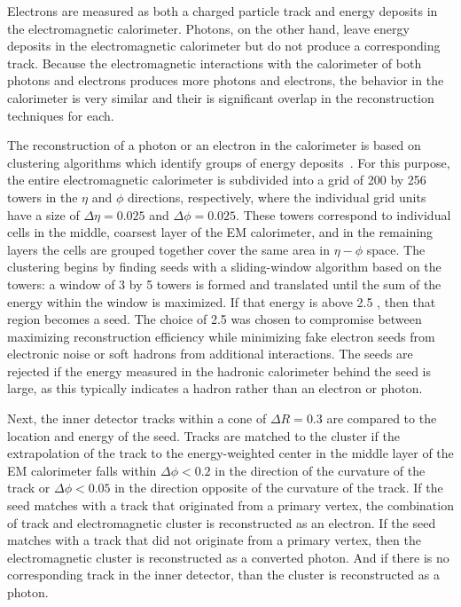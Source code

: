 Electrons are measured as both a charged particle track and energy deposits in the electromagnetic calorimeter.
Photons, on the other hand, leave energy deposits in the electromagnetic calorimeter but do not produce a corresponding track.
Because the electromagnetic interactions with the calorimeter of both photons and electrons produces more photons and electrons, the behavior in the calorimeter is very similar and their is significant overlap in the reconstruction techniques for each.

The reconstruction of a photon or an electron in the calorimeter is based on clustering algorithms which identify groups of energy deposits~\cite{PERF-2013-03, ATLAS-CONF-2014-032, ATLAS-CONF-2012-123}.
For this purpose, the entire electromagnetic calorimeter is subdivided into a grid of 200 by 256 towers in the $\eta$ and $\phi$ directions, respectively, where the individual grid units have a size of $\Delta\eta = 0.025$ and $\Delta\phi = 0.025$.
These towers correspond to individual cells in the middle, coarsest layer of the \ac{EM} calorimeter, and in the remaining layers the cells are grouped together cover the same area in $\eta-\phi$ space.
The clustering begins by finding seeds with a sliding-window algorithm based on the towers: a window of 3 by 5 towers is formed and translated until the sum of the energy within the window is maximized.
If that energy is above 2.5 \GeV, then that region becomes a seed.
The choice of 2.5 \GeV was chosen to compromise between maximizing reconstruction efficiency while minimizing fake electron seeds from electronic noise or soft hadrons from additional interactions.
The seeds are rejected if the energy measured in the hadronic calorimeter behind the seed is large, as this typically indicates a hadron rather than an electron or photon.

Next, the inner detector tracks within a cone of $\Delta R = 0.3$ are compared to the location and energy of the seed.
Tracks are matched to the cluster if the extrapolation of the track to the energy-weighted center in the middle layer of the \ac{EM} calorimeter falls within $\Delta\phi < 0.2$ in the direction of the curvature of the track or $\Delta\phi < 0.05$ in the direction opposite of the curvature of the track.
If the seed matches with a track that originated from a primary vertex, the combination of track and electromagnetic cluster is reconstructed as an electron.
If the seed matches with a track that did not originate from a primary vertex, then the electromagnetic cluster is reconstructed as a converted photon.
And if there is no corresponding track in the inner detector, than the cluster is reconstructed as a photon.

